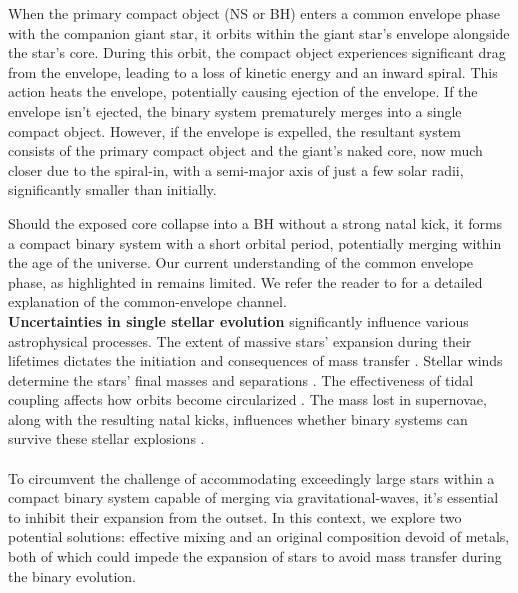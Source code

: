 When the primary compact object (NS or BH) enters a common envelope phase with the companion giant star, it orbits within the giant star's envelope alongside the star's core. During this orbit, the compact object experiences significant drag from the envelope, leading to a loss of kinetic energy and an inward spiral. This action heats the envelope, potentially causing  ejection of the envelope. If the envelope isn't ejected, the binary system prematurely merges into a single compact object. However, if the envelope is expelled, the resultant system consists of the primary compact object and the giant's naked core, now much closer due to the spiral-in, with a semi-major axis of just a few solar radii, significantly smaller than initially. 

Should the exposed core collapse into a BH without a strong natal kick, it forms a compact binary system with a short orbital period, potentially merging within the age of the universe. Our current understanding of the common envelope phase, as highlighted in \cite{Fragos:2019box} remains limited. We refer the reader to \cite{Paczynski:1993gz} for a detailed explanation of the common-envelope channel. \\

\textbf{Uncertainties in single stellar evolution} significantly influence various astrophysical processes. The extent of massive stars' expansion during their lifetimes dictates the initiation and consequences of mass transfer \cite{Laplace:2020hum}. Stellar winds determine the stars' final masses and separations \cite{Vink:2016epw}. The effectiveness of tidal coupling affects how orbits become circularized \cite{Zahn:1977mi}. The mass lost in supernovae, along with the resulting natal kicks, influences whether binary systems can survive these stellar explosions \cite{Muller:2020ard, Fryer:2011cx}. \\


\noindent {}\\

To circumvent the challenge of accommodating exceedingly large stars within a compact binary system capable of merging via gravitational-waves, it's essential to inhibit their expansion from the outset. In this context, we explore two potential solutions: effective mixing and an original composition devoid of metals, both of which could impede the expansion of stars to avoid mass transfer during the binary evolution.

